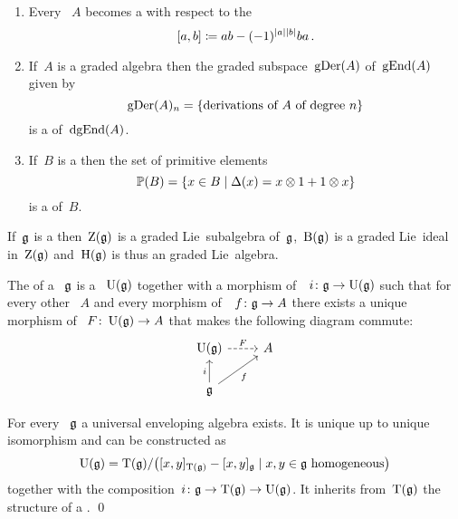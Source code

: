 \documentclass[a4paper,10pt,headings=standardclasses]{scrartcl}
\begin{document}
\begin{example}
  \leavevmode
  \begin{enumerate}
    \item
      Every {\dga}~$A$ becomes a {\dgl} with respect to the {\dgcom}
      \[
        [a,b]
        \coloneqq
        ab - (-1)^{\lvert a\rvert \lvert b\rvert} ba  \,.
      \]
    \item
      If~$A$ is a graded algebra then the graded subspace~$\operatorname{gDer}(A)$ of~$\operatorname{gEnd}(A)$ given by
      \[
        \operatorname{gDer}(A)_n
        =
        \{
          \text{derivations of~$A$ of degree~$n$}
        \}
      \]
      is a {\dglsub} of~$\operatorname{dgEnd}(A)$.
    \item
      If~$B$ is a {\dgb} then the set of primitive elements
      \[
        \prim(B)
        =
        \{
          x \in B
        \suchthat
          \Delta(x) = x \tensor 1 + 1 \tensor x
        \}
      \]
      is a {\dglsub} of~$B$.
  \end{enumerate}
\end{example}

\begin{lemma}
  If~$\mathfrak{g}$ is a {\dgl} then~$\operatorname{Z}(\mathfrak{g})$ is a graded Lie~subalgebra of~$\mathfrak{g}$,~$\operatorname{B}(\mathfrak{g})$ is a graded Lie~ideal in~$\operatorname{Z}(\mathfrak{g})$ and~$\operatorname{H}(\mathfrak{g})$ is thus an graded Lie~algebra. 
\end{lemma}


\begin{definition}
  The  of a {\dgl}~$\mathfrak{g}$ is a {\dga}~$\operatorname{U}(\mathfrak{g})$ together with a morphism of~{\dgls}~$i \colon \mathfrak{g} \to \operatorname{U}(\mathfrak{g})$ such that for every other {\dga}~$A$ and every morphism of~{\dgls}~$f \colon \mathfrak{g} \to A$ there exists a unique morphism of {\dgas}~$F \colon \operatorname{U}(\mathfrak{g}) \to A$ that makes the following diagram commute:
  \[
    \begin{tikzcd}
      \Univ(\glie)
      \arrow[dashed]{r}[above]{F}
      &
      A
      \\
      \glie
      \arrow{u}[left]{i}
      \arrow{ur}[below right]{f}
      &
      {}
    \end{tikzcd}
  \]
\end{definition}

\begin{proposition}
  For every {\dgl}~$\mathfrak{g}$ a universal enveloping algebra exists.
  It is unique up to unique isomorphism and can be constructed as
  \[
    \Univ(\glie)
    =
    \dgTensor(\glie)
    /
    \bigl(
      [x,y]_{\dgTensor(\glie)} - [x,y]_{\glie}
    \suchthat
      \text{$x, y \in \glie$ homogeneous}
    \bigr)
  \]
  together with the composition~$i \colon \mathfrak{g} \to \operatorname{T}(\mathfrak{g}) \to \operatorname{U}(\mathfrak{g})$.
  It inherits from~$\operatorname{T}(\mathfrak{g})$ the structure of a {\dgh}.
  \qed
\end{proposition}
\end{document}
